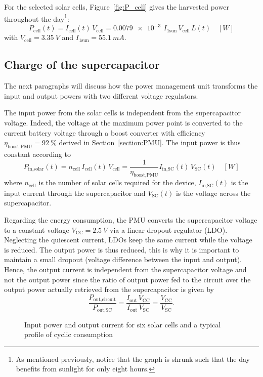 \documentclass{EPL-master-thesis-covers-EN}
\newcommand{\te}[1]{\textrm{#1}}
\begin{document}
For the selected solar cells, Figure~\ref{fig:P_cell} gives the harvested power throughout the day\footnote{As mentioned previously, notice that the graph is shrunk such that the day benefits from sunlight for only eight hours.}: 
\[
 P_\te{cell}(t) = I_\te{cell}(t)\,V_\te{cell} = \SI{0.0079e-3}{}\,I_{1\te{sun}}\,V_\te{cell}\,L(t) \quad \si{[W]}
\]
with $V_\te{cell} = \SI{3.35}{V}$ and $I_{1\te{sun}} = \SI{55.1}{mA}$.

\subsection*{Charge of the supercapacitor}

The next paragraphs will discuss how the power management unit transforms the input and output powers with two different voltage regulators.

The input power from the solar cells is independent from the supercapacitor voltage. Indeed, the voltage at the maximum power point is converted to the current battery voltage through a boost converter with efficiency $\eta_\te{boost,PMU}=\SI{92}{\%}$ derived in Section~\ref{section:PMU}. The input power is thus constant according to
\[
 P_\te{in,solar}(t) = n_\te{¢ell} \, I_\te{cell}(t)\,V_\te{cell} = \frac{1}{\eta_\te{boost,PMU}} I_\te{in,SC}(t) \, V_\te{SC}(t) \quad [\si{W}]
\]
where $n_\te{¢ell}$ is the number of solar cells required for the device, $I_\te{in,SC}(t)$ is the input current through the supercapacitor and $V_\te{SC}(t)$ is the voltage across the supercapacitor.

Regarding the energy consumption, the PMU converts the supercapacitor voltage to a constant voltage $V_\te{CC}= \SI{2.5}{V}$ via a linear dropout regulator (LDO). Neglecting the quiescent current, LDOs keep the same current while the voltage is reduced. The output power is thus reduced, this is why it is important to maintain a small dropout (voltage difference between the input and output). Hence, the output current is independent from the supercapacitor voltage and not the output power since the ratio of output power fed to the circuit over the output power actually retrieved from the supercapacitor is given by
\[
 \frac{P_\te{out,circuit}}{P_\te{out,SC}} = \frac{I_\te{out} \, V_\te{CC}}{I_\te{out} \, V_\te{SC}} = \frac{V_\te{CC}}{V_\te{SC}}.
\]

\begin{figure}[H]
    \centering
    
    \caption{Input power and output current for six solar cells and a typical profile of cyclic consumption}
    \label{fig:P_in_I_out}
\end{figure}
\end{document}
